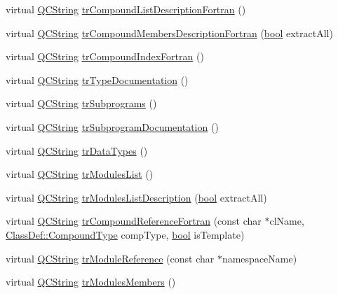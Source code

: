\begin{DoxyCompactItemize}
virtual \hyperlink{class_q_c_string}{Q\+C\+String} \hyperlink{class_translator_danish_a3f278f32e828bde2cce5380bbe560f66}{tr\+Compound\+List\+Description\+Fortran} ()
\item 
virtual \hyperlink{class_q_c_string}{Q\+C\+String} \hyperlink{class_translator_danish_ac672f73b85740797aabac6b958c83a53}{tr\+Compound\+Members\+Description\+Fortran} (\hyperlink{qglobal_8h_a1062901a7428fdd9c7f180f5e01ea056}{bool} extract\+All)
\item 
virtual \hyperlink{class_q_c_string}{Q\+C\+String} \hyperlink{class_translator_danish_a485989c469752296a1aa78db10db3603}{tr\+Compound\+Index\+Fortran} ()
\item 
virtual \hyperlink{class_q_c_string}{Q\+C\+String} \hyperlink{class_translator_danish_aa34f4dd28e9913527eb3c9f19faadd7e}{tr\+Type\+Documentation} ()
\item 
virtual \hyperlink{class_q_c_string}{Q\+C\+String} \hyperlink{class_translator_danish_a351a750f1abe7133a5a674e46ac9dc45}{tr\+Subprograms} ()
\item 
virtual \hyperlink{class_q_c_string}{Q\+C\+String} \hyperlink{class_translator_danish_ab47e9988928a8e3900226c7abf06e0a8}{tr\+Subprogram\+Documentation} ()
\item 
virtual \hyperlink{class_q_c_string}{Q\+C\+String} \hyperlink{class_translator_danish_ae1798ff67ba1e0fbdbba1efe26fcecfa}{tr\+Data\+Types} ()
\item 
virtual \hyperlink{class_q_c_string}{Q\+C\+String} \hyperlink{class_translator_danish_aa432303edf5024bd895f14e11d2a64eb}{tr\+Modules\+List} ()
\item 
virtual \hyperlink{class_q_c_string}{Q\+C\+String} \hyperlink{class_translator_danish_a40b5a6104ed57a5f5495732972d9b863}{tr\+Modules\+List\+Description} (\hyperlink{qglobal_8h_a1062901a7428fdd9c7f180f5e01ea056}{bool} extract\+All)
\item 
virtual \hyperlink{class_q_c_string}{Q\+C\+String} \hyperlink{class_translator_danish_a0f924fbeca4d1a4011cd7eea2a65a5db}{tr\+Compound\+Reference\+Fortran} (const char $\ast$cl\+Name, \hyperlink{class_class_def_ae70cf86d35fe954a94c566fbcfc87939}{Class\+Def\+::\+Compound\+Type} comp\+Type, \hyperlink{qglobal_8h_a1062901a7428fdd9c7f180f5e01ea056}{bool} is\+Template)
\item 
virtual \hyperlink{class_q_c_string}{Q\+C\+String} \hyperlink{class_translator_danish_a8f089a8b6af0a93491cb91a55b4d61e9}{tr\+Module\+Reference} (const char $\ast$namespace\+Name)
\item 
virtual \hyperlink{class_q_c_string}{Q\+C\+String} \hyperlink{class_translator_danish_a9a2de5b46f1ec6faed8208e7c15c1670}{tr\+Modules\+Members} ()

\end{DoxyCompactItemize}
